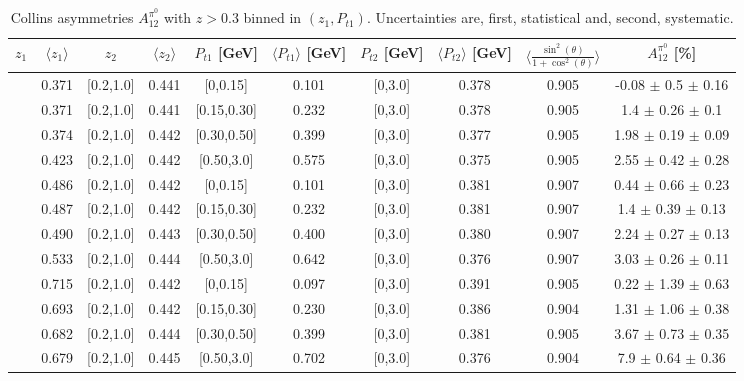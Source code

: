 \documentclass[aps,prX,preprint,groupedaddress,linenumbers]{revtex4-1}
\begin{document}
\begin{table}[H]
\centering
\begin{tabular}{|c| c| c| c| c| c| c| c| c| c|}
\hline
$z_1$& $\langle  z_{1}  \rangle$ & $z_2$ & $\langle  z_{2}\rangle$& $P_{t1}$ [GeV] & $\langle  P_{t1} \rangle$ [GeV] & $P_{t2}$ [GeV] &  $\langle P_{t2}\rangle$ [GeV] &$\langle\frac{\sin^2(\theta)}{1+\cos^2(\theta)}\rangle$& $A_{12}^{\pi^0}$ [\%]   \\ \hline
[0.3,0.5]	&	0.371	&	[0.2,1.0]	&	0.441	&	[0,0.15]	&	0.101	&	[0,3.0]	&	0.378	&	0.905	& -0.08  $\pm$ 0.5  $\pm$ 0.16     \\ \hline
[0.3,0.5]	&	0.371	&	[0.2,1.0]	&	0.441	&	[0.15,0.30]	&	0.232	&	[0,3.0]	&	0.378	&	0.905	& 1.4  $\pm$ 0.26  $\pm$ 0.1       \\ \hline
[0.3,0.5]	&	0.374	&	[0.2,1.0]	&	0.442	&	[0.30,0.50]	&	0.399	&	[0,3.0]	&	0.377	&	0.905	& 1.98  $\pm$ 0.19  $\pm$ 0.09     \\ \hline
[0.3,0.5]	&	0.423	&	[0.2,1.0]	&	0.442	&	[0.50,3.0]	&	0.575	&	[0,3.0]	&	0.375	&	0.905	& 2.55  $\pm$ 0.42  $\pm$ 0.28     \\ \hline
\hline
[0.5,0.7]	&	0.486	&	[0.2,1.0]	&	0.442	&	[0,0.15]	&	0.101	&	[0,3.0]	&	0.381	&	0.907	& 0.44  $\pm$ 0.66  $\pm$ 0.23     \\ \hline
[0.5,0.7]	&	0.487	&	[0.2,1.0]	&	0.442	&	[0.15,0.30]	&	0.232	&	[0,3.0]	&	0.381	&	0.907	& 1.4  $\pm$ 0.39  $\pm$ 0.13      \\ \hline
[0.5,0.7]	&	0.490	&	[0.2,1.0]	&	0.443	&	[0.30,0.50]	&	0.400	&	[0,3.0]	&	0.380	&	0.907	& 2.24  $\pm$ 0.27  $\pm$ 0.13     \\ \hline
[0.5,0.7]	&	0.533	&	[0.2,1.0]	&	0.444	&	[0.50,3.0]	&	0.642	&	[0,3.0]	&	0.376	&	0.907	& 3.03  $\pm$ 0.26  $\pm$ 0.11     \\ \hline
\hline
[0.7,1.0]	&	0.715	&	[0.2,1.0]	&	0.442	&	[0,0.15]	&	0.097	&	[0,3.0]	&	0.391	&	0.905	& 0.22  $\pm$ 1.39  $\pm$ 0.63     \\ \hline
[0.7,1.0]	&	0.693	&	[0.2,1.0]	&	0.442	&	[0.15,0.30]	&	0.230	&	[0,3.0]	&	0.386	&	0.904	& 1.31  $\pm$ 1.06  $\pm$ 0.38     \\ \hline
[0.7,1.0]	&	0.682	&	[0.2,1.0]	&	0.444	&	[0.30,0.50]	&	0.399	&	[0,3.0]	&	0.381	&	0.905	& 3.67  $\pm$ 0.73  $\pm$ 0.35     \\ \hline
[0.7,1.0]	&	0.679	&	[0.2,1.0]	&	0.445	&	[0.50,3.0]	&	0.702	&	[0,3.0]	&	0.376	&	0.904	& 7.9  $\pm$ 0.64  $\pm$ 0.36   	\\ \hline
\end{tabular}
\caption[Collins asymmetries $A_{12}^{\pi^0}$ with $z>0.3$ binned in $(z_{1},P_{t1})$]{Collins asymmetries $A_{12}^{\pi^0}$ with $z>0.3$ binned in $(z_{1},P_{t1})$. Uncertainties are, first, statistical and, second, systematic.}
\label{tab:finaletaptbins}
\end{table}
\end{document}
